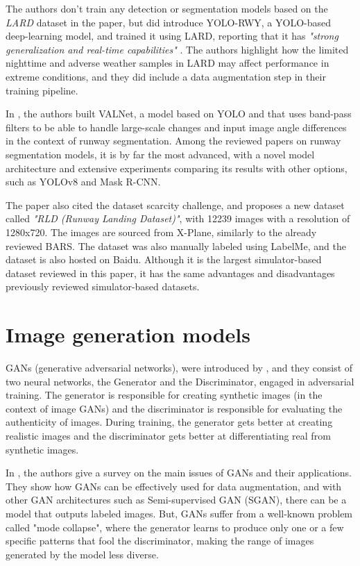 The authors don't train any detection or segmentation models based on the \emph{LARD} dataset in the paper, but \cite{li_yolo-rwy_2024} did introduce YOLO-RWY, a YOLO-based deep-learning model, and trained it using LARD, reporting that it has \emph{"strong generalization and real-time capabilities"} \cite{li_yolo-rwy_2024}. The authors highlight how the limited nighttime and adverse weather samples in LARD may affect performance in extreme conditions, and they did include a data augmentation step in their training pipeline.

In \cite{wang_valnet_2024}, the authors built VALNet, a model based on YOLO and that uses band-pass filters to be able to handle large-scale changes and input image angle differences in the context of runway segmentation. Among the reviewed papers on runway segmentation models, it is by far the most advanced, with a novel model architecture and extensive experiments comparing its results with other options, such as YOLOv8 and Mask R-CNN.

The paper also cited the dataset scarcity challenge, and proposes a new dataset called \emph{"RLD (Runway Landing Dataset)"}, with 12239 images with a resolution of 1280x720. The images are sourced from X-Plane, similarly to the already reviewed BARS. The dataset was also manually labeled using LabelMe, and the dataset is also hosted on Baidu. Although it is the largest simulator-based dataset reviewed in this paper, it has the same advantages and disadvantages previously reviewed simulator-based datasets.

\section{Image generation models}

GANs (generative adversarial networks), were introduced by \cite{goodfellow_generative_2014}, and they consist of two neural networks, the Generator and the Discriminator, engaged in adversarial training. The generator is responsible for creating synthetic images (in the context of image GANs) and the discriminator is responsible for evaluating the authenticity of images. During training, the generator gets better at creating realistic images and the discriminator gets better at differentiating real from synthetic images.

In \cite{cohen_generative_2022}, the authors give a survey on the main issues of GANs and their applications. They show how GANs can be effectively used for data augmentation, and with other GAN architectures such as Semi-supervised GAN (SGAN), there can be a model that outputs labeled images. But, GANs suffer from a well-known problem called "mode collapse", where the generator learns to produce only one or a few specific patterns that fool the discriminator, making the range of images generated by the model less diverse.

